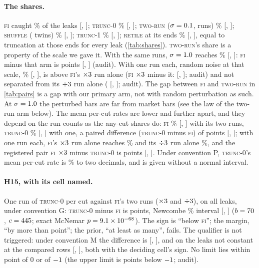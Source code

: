 \documentclass[11pt]{article}
\newcommand{\FI}{\textsc{fi}}
\newcommand{\TZ}{\textsc{trunc-0}}
\newcommand{\TO}{\textsc{trunc-1}}
\newcommand{\RT}{\textsc{retile}}
\newcommand{\TR}{\textsc{two-run}}
\newcommand{\SH}{\textsc{shuffle}}
\newcommand{\pct}{\%}
\begin{document}
\paragraph{The shares.} \FI{} caught \NumCFiAll\pct{} of the leaks [\NumCFiAllLo, \NumCFiAllHi];
\TZ{} \NumCTzGAll\pct{} [\NumCTzGAllLo, \NumCTzGAllHi]; \TR{} ($\sigma=0.1$, \NumRunsTwo{}
runs) \NumCTrAll\pct{} [\NumCTrAllLo, \NumCTrAllHi]; \SH{} (\NumShuffleK{} twins)
\NumCShAll\pct{} [\NumCShAllLo, \NumCShAllHi]; \TO{} \NumCToGAll\pct{} [\NumCToGAllLo,
\NumCToGAllHi]; \RT{} at its \NumTileEnds{} ends \NumCRtGAll\pct{} [\NumCRtGAllLo, \NumCRtGAllHi],
equal to truncation at those ends for every leak (\cref{tab:shares}).
\TR's share is a property of the scale we gave it. With the same \NumRunsTwo{} runs,
$\sigma=1.0$ reaches \NumCTrHiAll\pct{} [\NumCTrHiAllLo, \NumCTrHiAllHi]: \FI{} minus that
arm is \NumBHiDiff{} points [\NumBHiLo, \NumBHiHi] (audit). With one run each, random noise at
that scale, \NumCTrHiOneAll\pct{} [\NumCTrHiOneAllLo, \NumCTrHiOneAllHi], is above \FI's
$\times3$ run alone (\FI{} $\times3$ minus it: \NumBHiUpDiff{} [\NumBHiUpLo,
\NumBHiUpHi]; audit) and not separated from its $\div3$ run alone (\NumBHiDownDiff{}
[\NumBHiDownLo, \NumBHiDownHi]; audit). The gap between \FI{} and \TR{} in \cref{tab:pairs} is a
gap with our primary arm, not with random perturbation as such. At $\sigma=1.0$ the
perturbed bars are far from market bars (see the law of the two-run arm below).
The mean per-cut rates are
lower and further apart, and they depend on the run counts as the any-cut shares do: \FI{}
\NumCFiMpc\pct{} [\NumCFiMpcLo, \NumCFiMpcHi] with its two runs, \TZ{} \NumCTzGMpc\pct{}
[\NumCTzGMpcLo, \NumCTzGMpcHi] with one, a paired difference (\TZ{} minus \FI) of \NumCMpcDiff{}
points [\NumCMpcDiffLo, \NumCMpcDiffHi]; with one run each, \FI's $\times3$ run alone
reaches \NumCFiUpMpc\pct{} and its $\div3$ run alone \NumCFiDownMpc\pct, and the
registered pair \FI{} $\times3$ minus \TZ{} is \NumCEqFiUpTzMpc{} points
[\NumCEqFiUpTzMpcLo, \NumCEqFiUpTzMpcHi]. Under convention P, \TZ's mean per-cut rate
is \NumCTzPMpc\pct{} to two decimals, and is given without a normal interval.

\paragraph{H15, with its cell named.} One run of \TZ{} per cut against \FI's two runs
($\times3$ and $\div3$), on all leaks, under convention G: \TZ{} minus \FI{} is
\NumCHDiff{} points, Newcombe \NumConf\pct{} interval [\NumCHLo, \NumCHHi] ($b = 70$,
$c = 445$; exact McNemar $p = 9.1\times 10^{-68}$). The sign is ``below \FI''; the margin, ``by more than
\NumHfifteenMargin{} point''; the prior, ``at least as many'', fails. The qualifier is not
triggered: under convention M the difference is \NumCQMDiff{} [\NumCQMLo, \NumCQMHi], and on the
leaks not constant at the compared rows \NumCQNcDiff{} [\NumCQNcLo, \NumCQNcHi], both with the
deciding cell's sign. No limit lies within \NumPsiFlag{} point of 0 or of $-1$
(the upper limit is \NumCUpperFromMargin{} points below $-1$; audit).
\end{document}

